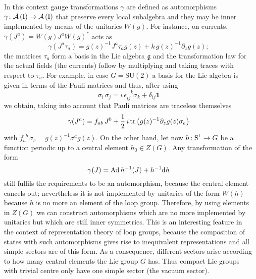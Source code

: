  In this context gauge transformations $\gamma$ are defined 
 as automorphisms $\gamma\colon\mathcal{A}\left(\textrm{I}\right)\to\mathcal{A}\left(\textrm{I}\right)$ 
 that preserve every local subalgebra and they may 
 be inner implemented by means of the unitaries $W(g)$.
 For instance, on currents, $\gamma(J^a)=W(g)J^a W(g)^*$ 
 acts as
 \[
 \gamma(J^a\tau_a)=g(z)^{-1} J^a\tau_a g(z) +
 k\,g(z)^{-1}\partial_z g(z);
 \]
 the matrices $\tau_a$ form a basis in the Lie algebra 
 $\mathfrak{g}$ and the transformation law
 for the actual fields (the currents) follow by multiplying
 and taking traces with respect to $\tau_a$. For example, in
 case $G=\textrm{SU}(2)$ a basis for the Lie algebra is 
 given in terms of the Pauli matrices and thus, after using
 \[
 \sigma_i\,\sigma_j=i\,\epsilon_{ij}^{\phantom{ij}k}\sigma_k
 +\delta_{ij}\bm{1}
 \]
 we obtain, taking into account that Pauli matrices
 are traceless themselves
 \[
 \gamma(J^a)=f_{ab}\,J^b +\frac{1}{2}\,
 i\operatorname{tr}\left(g(z)^{-1}\partial_z g(z)\sigma_a\right)
 \] 
 with $f_{a}^{\phantom{a}b}\,\sigma_b=g(z)^{-1}\sigma^a g(z)$.
 On the other hand, let now $h\colon\textrm{S}^1\to G$ be a function
 periodic up to a central element $h_0\in Z(G)$. 
 Any transformation of the form
 \[
 \gamma(J)=\operatorname{Ad} h^{-1} (J) + h^{-1} \textrm{d} h
 \]
 still fulfils the requirements to be an
 automorphism, because the central element
 cancels out; nevertheless it is not implemented
 by unitaries of the form $W(h)$ because 
 $h$ is no more an element of the loop group.
 Therefore, by using elements in $Z(G)$
 we can construct automorphisms which are no
 more implemented by unitaries but which are still 
 inner symmetries. This is an interesting feature in the
 context of representation theory of loop groups,
 because the composition of states with such automorphisms
 gives rise to inequivalent representations and all
 simple sectors are of this form. As a 
 consequence, different sectors arise according to
 how many central elements the Lie group $G$ has.
 Thus compact Lie groups with trivial centre only have
 one simple sector (the vacuum sector).
